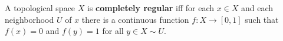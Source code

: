 A topological space $X$ is \textbf{completely regular} iff for each $x \in X$ and each neighborhood $U$ of $x$ there is a continuous function $f : X \to [0,1]$ such that $f(x) = 0$ and $f(y) = 1$ for all $y \in X \sim U$.
